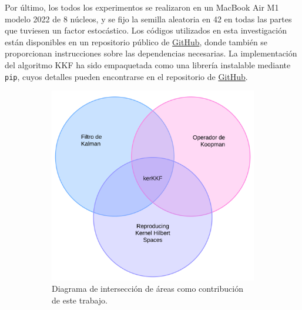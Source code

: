 Por último, los todos los experimentos se realizaron en un MacBook Air M1 modelo 2022 de 8 núcleos, y se fijo la semilla aleatoria en 42 en todas las partes que tuviesen un factor estocástico. Los códigos utilizados en esta investigación están disponibles en un repositorio público de \href{https://github.com/diegoolguinw/Koopman_nonlinear_filter}{GitHub}, donde también se proporcionan instrucciones sobre las dependencias necesarias. La implementación del algoritmo KKF ha sido empaquetada como una librería instalable mediante \texttt{pip}, cuyos detalles pueden encontrarse en el repositorio de \href{https://github.com/diegoolguinw/kkf}{GitHub}.

\begin{figure}[h]
    \centering
    \begin{subfigure}[b]{0.45\linewidth}
        \includegraphics[width=0.9\linewidth]{img/content/chapter1/Venn_Diagram_Thesis.pdf}
        \caption{Diagrama de intersección de áreas como contribución de este trabajo.}
        \label{fig:venn_diagram}
    \end{subfigure}
    \begin{subfigure}[b]{0.45\linewidth}

\end{subfigure}
\end{figure}
